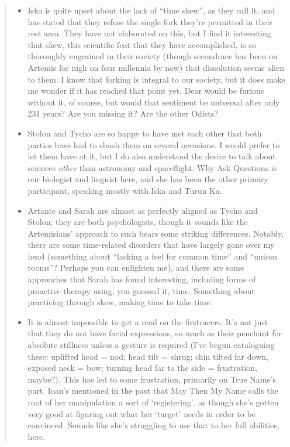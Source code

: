 \begin{quote}
\begin{itemize}
\tightlist
\item
  Iska is quite upset about the lack of ``time skew'', as they call it, and has stated that they refuse the single fork they're permitted in their rest area. They have not elaborated on this, but I find it interesting that skew, this scientific feat that they have accomplished, is so thoroughly engrained in their society (though secondrace has been on Artemis for nigh on four millennia by now) that dissolution seems alien to them. I know that forking is integral to our society, but it does make me wonder if it has reached that point yet. Dear would be furious without it, of course, but would that sentiment be universal after only 231 years? Are you missing it? Are the other Odists?
\item
  Stolon and Tycho are so happy to have met each other that both parties have had to shush them on several occasions. I would prefer to let them have at it, but I do also understand the desire to talk about sciences \emph{other} than astronomy and spaceflight. Why Ask Questions is our biologist and linguist here, and she has been the other primary participant, speaking mostly with Iska and Turun Ka.
\item
  Artante and Sarah are almost as perfectly aligned as Tycho and Stolon; they are both psychologists, though it sounds like the Artemisians' approach to such bears some striking differences. Notably, there are some time-related disorders that have largely gone over my head (something about ``lacking a feel for common time'' and ``unison rooms''? Perhaps you can enlighten me), and there are some approaches that Sarah has found interesting, including forms of proactive therapy using, you guessed it, time. Something about practicing through skew, making time to take time.
\item
  It is almost impossible to get a read on the firstracers. It's not just that they do not have facial expressions, so much as their penchant for absolute stillness unless a gesture is required (I've begun cataloguing these: uplifted head = nod; head tilt = shrug; chin tilted far down, exposed neck = bow; turning head far to the side = frustration, maybe?). This has led to some frustration, primarily on True Name's part. Ioan's mentioned in the past that May Then My Name calls the root of her manipulation a sort of `registering', as though she's gotten very good at figuring out what her `target' needs in order to be convinced. Sounds like she's struggling to use that to her full abilities, here.

\end{itemize}
\end{quote}
